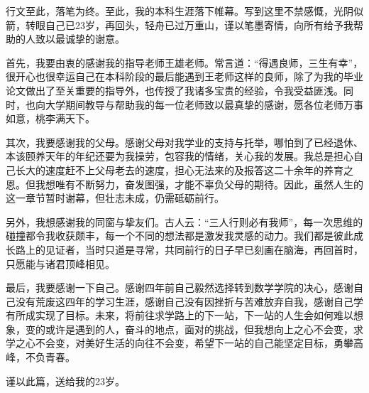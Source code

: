 \documentclass[oneside]{sysuthesis}
\begin{document}
\begin{acknowledgements}
  行文至此，落笔为终。至此，我的本科生涯落下帷幕。写到这里不禁感慨，光阴似箭，转眼自己已23岁，再回头，轻舟已过万重山，谨以笔墨寄情，向所有给予我帮助的人致以最诚挚的谢意。
  
  首先，我要由衷的感谢我的指导老师王雄老师。常言道：“得遇良师，三生有幸”，很开心也很幸运自己在本科阶段的最后能遇到王老师这样的良师，除了为我的毕业论文做出了至关重要的指导外，也传授了我诸多宝贵的经验，令我受益匪浅。同时，也向大学期间教导与帮助我的每一位老师致以最真挚的感谢，愿各位老师万事如意，桃李满天下。
  
  其次，我要感谢我的父母。感谢父母对我学业的支持与托举，哪怕到了已经退休、本该颐养天年的年纪还要为我操劳，包容我的情绪，关心我的发展。我总是担心自己长大的速度赶不上父母老去的速度，担心无法来的及报答这二十余年的养育之恩。但我想唯有不断努力，奋发图强，才能不辜负父母的期待。因此，虽然人生的这一章节暂时谢幕，但壮志未成，仍需砥砺前行。
  
  另外，我想感谢我的同窗与挚友们。古人云：“三人行则必有我师”，每一次思维的碰撞都令我收获颇丰，每一个不同的想法都是激发我灵感的动力。我们都是彼此成长路上的见证者，当时只道是寻常，共同前行的日子早已刻画在脑海，再回首时，只愿能与诸君顶峰相见。
  
  最后，我要感谢一下自己。感谢四年前自己毅然选择转到数学学院的决心，感谢自己没有荒废这四年的学习生涯，感谢自己没有因挫折与苦难放弃自我，感谢自己学有所成实现了目标。未来，将前往求学路上的下一站，下一站的人生会如何难以想象，变的或许是遇到的人，奋斗的地点，面对的挑战，但我想向上之心不会变，求学之心不会变，对美好生活的向往不会变，希望下一站的自己能坚定目标，勇攀高峰，不负青春。
  
  谨以此篇，送给我的23岁。
\end{acknowledgements}
\end{document}
